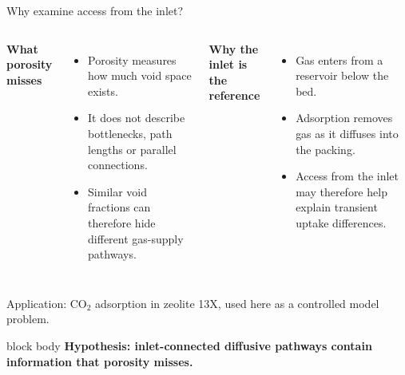 \documentclass[aspectratio=169,11pt]{beamer}
\newcommand{\hi}[1]{\textcolor{tumblue}{\textbf{#1}}}
\newcommand{\result}[1]{%
  \begin{beamercolorbox}[rounded=true,sep=0.55em]{block body}
  \centering\color{tumdark}\textbf{#1}
  \end{beamercolorbox}}
\begin{document}
\begin{frame}{Why examine access from the inlet?}

\begin{columns}[T,onlytextwidth]
\hi{What porosity misses}\small
\begin{itemize}
\item Porosity measures how much void space exists.
\item It does not describe bottlenecks, path lengths or parallel connections.
\item Similar void fractions can therefore hide different gas-supply pathways.
\end{itemize}
\hi{Why the inlet is the reference}\small
\begin{itemize}
\item Gas enters from a reservoir below the bed.
\item Adsorption removes gas as it diffuses into the packing.
\item Access from the inlet may therefore help explain transient uptake differences.
\end{itemize}
\end{columns}
\vspace{0.25cm}
\small Application: CO$_2$ adsorption in zeolite 13X, used here as a controlled model problem.
\vspace{0.2cm}
\result{Hypothesis: inlet-connected diffusive pathways contain information that porosity misses.}

\end{frame}
\end{document}
